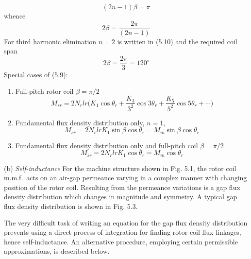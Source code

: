 \documentclass[a4paper,numbers=noenddot,12pt]{scrbook}
\begin{document}
\begin{equation*}
    (2n - 1)\beta = \pi
\end{equation*}
whence
\begin{equation}
    2\beta=\frac{2\pi}{(2n-1)}
\end{equation}
For third harmonic elimination $n = 2$ is written in (5.10) and the required coil span
\begin{equation*}
    2\beta = \frac{2\pi}{3} = 120^{\circ}
\end{equation*}
Special cases of (5.9):
\begin{enumerate}[label={(\alph*)}]
    \item Full-pitch rotor coil $\beta = \pi/2$
        \begin{equation}
            M_{sr} = 2 N_r l r \bigg( K_1 \cos\theta_r + \frac{K_3}{3^2} \cos 3 \theta_r + \frac{K_5}{5^2} \cos 5 \theta_r + \cdots \bigg)
        \end{equation}
    \item
        Fundamental flux density distribution only, $n=1$,
        \begin{equation}
            M_{sr}=2N_r l r K_1 \sin\beta\cos\theta_r = M_m \sin \beta \cos \theta_r
        \end{equation}
    \item
        Fundamental flux density distribution only and full-pitch coil $\beta=\pi/2$
        \begin{equation}
            M_{sr} = 2 N_r l r K_1 \cos\theta_r = M_m \cos\theta_r
        \end{equation}
\end{enumerate}

\noindent
(b) \textit{Self-inductance} For the machine structure shown in Fig. 5.1, the rotor coil m.m.f.\ acts on an air-gap permeance varying in a complex manner with changing position of the rotor coil. Resulting from the permeance variations is a gap flux density distribution which changes in magnitude and symmetry. A typical gap flux density distribution is shown in Fig. 5.3. \par

The very difficult task of writing an equation for the gap flux density distribution prevents using a direct process of integration for finding rotor coil flux-linkages, hence self-inductance. An alternative procedure, employing certain permissible approximations, is described below. \par
\end{document}
